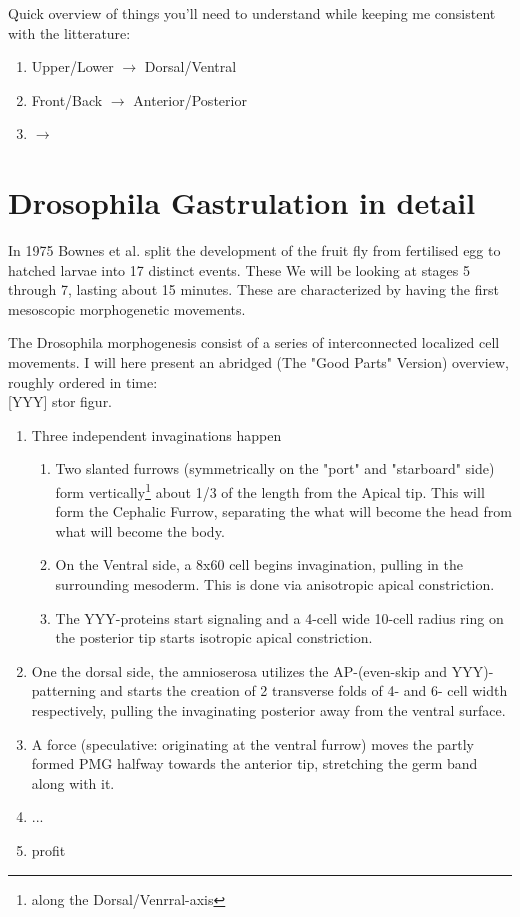 Quick overview of things you'll need to understand while keeping me consistent with the litterature:

\begin{enumerate}
    \item Upper/Lower $\rightarrow$ Dorsal/Ventral
    \item Front/Back  $\rightarrow$ Anterior/Posterior
    \item   $\rightarrow$
\end{enumerate}
\section{Drosophila Gastrulation in detail}
In 1975 Bownes et al. split the development of the fruit fly from fertilised egg to hatched larvae into 17 distinct events. \cite{bownes1975photographic} These
We will be looking at stages 5 through 7, lasting about 15 minutes. These are characterized by having the first mesoscopic morphogenetic movements.

The Drosophila morphogenesis consist of a series of interconnected localized cell movements. I will here present an abridged (The "Good Parts" Version) overview, roughly ordered in time:\\

[YYY] stor figur.\\

\begin{enumerate}
    \item Three independent invaginations happen
    \begin{enumerate}
        \item Two slanted furrows (symmetrically on the "port" and "starboard" side) form vertically\footnote{along the Dorsal/Venrral-axis} about 1/3 of the length from the Apical tip\cite{}. This will form the Cephalic Furrow, separating the what will become the head from what will become the body. 
        \item  On the Ventral side, a 8x60 cell\cite{} begins invagination, pulling in the surrounding mesoderm. This is done via anisotropic\cite{} apical constriction\cite{}.
        \item The YYY-proteins start signaling\cite{} and a 4-cell wide 10-cell radius\cite{} ring on the posterior tip starts isotropic apical constriction\cite{}.
    \end{enumerate}
    \item One the dorsal side, the amnioserosa utilizes the AP-(even-skip and YYY)-patterning\cite{} and starts the creation of 2 transverse folds of 4- and 6- cell width respectively, pulling the invaginating posterior away from the ventral surface.
    \item  A force (speculative: originating at the ventral furrow) moves the partly formed PMG halfway towards the anterior tip, stretching the germ band along with it.
    \item ...
    \item profit
\end{enumerate}




